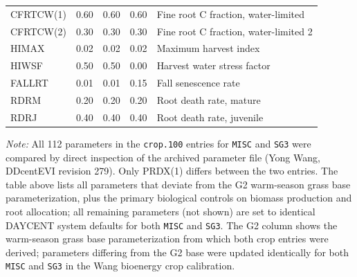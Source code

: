 \documentclass[11pt]{article}
\begin{document}
\begin{longtable}{llllp{6cm}}
CFRTCW(1) & 0.60 & 0.60 & 0.60 & Fine root C fraction, water-limited \\
CFRTCW(2) & 0.30 & 0.30 & 0.30 & Fine root C fraction, water-limited 2 \\
HIMAX & 0.02 & 0.02 & 0.02 & Maximum harvest index \\
HIWSF & 0.50 & 0.50 & 0.00 & Harvest water stress factor \\
FALLRT & 0.01 & 0.01 & 0.15 & Fall senescence rate \\
RDRM & 0.20 & 0.20 & 0.20 & Root death rate, mature \\
RDRJ & 0.40 & 0.40 & 0.40 & Root death rate, juvenile \\
\bottomrule
\end{longtable}

\textit{Note:} All 112 parameters in the \texttt{crop.100} entries for \texttt{MISC} and \texttt{SG3} were compared by direct inspection of the archived parameter file (Yong Wang, DDcentEVI revision 279). Only PRDX(1) differs between the two entries. The table above lists all parameters that deviate from the G2 warm-season grass base parameterization, plus the primary biological controls on biomass production and root allocation; all remaining parameters (not shown) are set to identical DAYCENT system defaults for both \texttt{MISC} and \texttt{SG3}. The G2 column shows the warm-season grass base parameterization from which both crop entries were derived; parameters differing from the G2 base were updated identically for both \texttt{MISC} and \texttt{SG3} in the Wang bioenergy crop calibration.

\printbibliography
\end{document}
